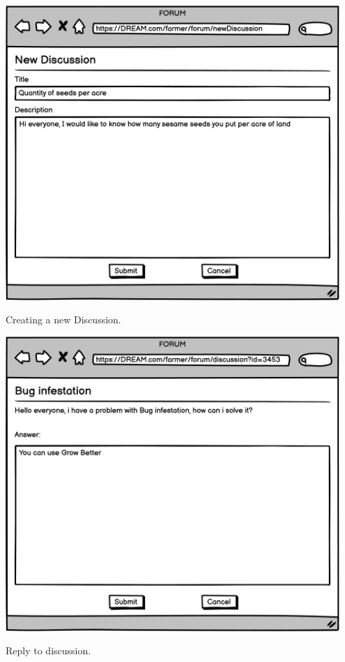 \vspace{0.5cm}
\begin{minipage}{.5\textwidth}
	\centering
	\includegraphics[width=0.95\textwidth]{Images/Mockup/Farmer/09FarmerForumNewDiscussion.png}
	\captionsetup{type=figure}
	\caption{Creating a new Discussion.}
\end{minipage}%
\begin{minipage}{.5\textwidth}
	\centering
	\includegraphics[width=0.95\textwidth]{Images/Mockup/Farmer/10FarmerForumDiscussion.png}
	\captionsetup{type=figure}
	\caption{Reply to discussion.}
\end{minipage}
